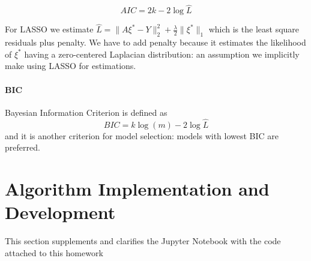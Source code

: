 \documentclass{article}
\begin{document}
\[
    AIC = 2k - 2\log{\hat{L}}
\]

For LASSO we estimate $\hat{L} = \|A\xi^*-Y\|_2^2 + \frac{\lambda}{2}\|\xi^*\|_1$ which is the least square residuals plus penalty. We have to add penalty because it estimates the likelihood of $\xi^*$ having a zero-centered Laplacian distribution: an assumption we implicitly make using LASSO for estimations. 
    
\paragraph{BIC} Bayesian Information Criterion is defined as 
\[
    BIC = k\log(m)-2\log{\hat{L}}
\]
and it is another criterion for model selection: models with lowest BIC are preferred. 

\section{Algorithm Implementation and Development}
This section supplements and clarifies the Jupyter Notebook with the code attached to this homework 
 
\end{document}
